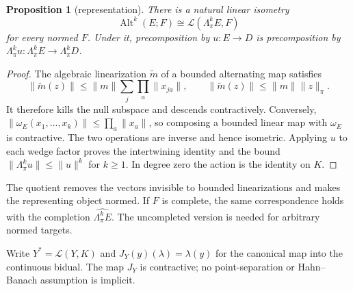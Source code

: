 \documentclass[11pt]{amsart}
\newtheorem{proposition}[theorem]{Proposition}
\theoremstyle{definition}
\theoremstyle{remark}
\numberwithin{equation}{section}
\newcommand{\cL}{\mathcal L}
\newcommand{\Alt}{\operatorname{Alt}}
\newcommand{\norm}[1]{\lVert #1\rVert}
\begin{document}
\begin{proposition}[representation]\label{prop:exterior}
There is a natural linear isometry
\[
 \Alt^k(E;F)\cong\cL(\Lambda^k_\pi E,F)
\]
for every normed $F$. Under it, precomposition by $u\colon E\to D$ is precomposition by
$\Lambda^k_\pi u\colon\Lambda^k_\pi E\to\Lambda^k_\pi D$.
\end{proposition}
\begin{proof}
The algebraic linearization $\widetilde m$ of a bounded alternating map satisfies
\[
 \norm{\widetilde m(z)}\le\norm m\sum_j\prod_a\norm{x_{ja}},
 \qquad \norm{\widetilde m(z)}\le\norm m\norm z_\pi.
\]
It therefore kills the null subspace and descends contractively. Conversely,
$\norm{\omega_E(x_1,\ldots,x_k)}\le\prod_a\norm{x_a}$, so composing a bounded linear map with
$\omega_E$ is contractive. The two operations are inverse and hence isometric. Applying $u$ to each
wedge factor proves the intertwining identity and the bound $\norm{\Lambda^k_\pi u}\le\norm u^k$
for $k\ge1$. In degree zero the action is the identity on $K$.
\end{proof}

The quotient removes the vectors invisible to bounded linearizations and makes the representing
object normed. If $F$ is complete, the same correspondence holds with the completion
$\widehat{\Lambda^k_\pi E}$. The uncompleted version is needed for arbitrary normed targets.

Write $Y^*=\cL(Y,K)$ and $J_Y(y)(\lambda)=\lambda(y)$ for the canonical map into the continuous
bidual. The map $J_Y$ is contractive; no point-separation or Hahn--Banach assumption is implicit.
\end{document}
